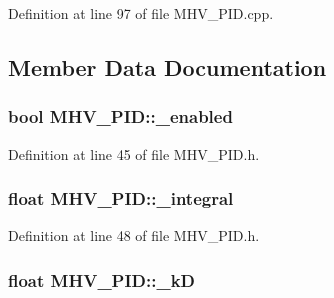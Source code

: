 \-Definition at line 97 of file \-M\-H\-V\-\_\-\-P\-I\-D.\-cpp.



\subsection{\-Member \-Data \-Documentation}
\hypertarget{class_m_h_v___p_i_d_a17e676a4ac1b18dcf30417b73265e87f}{
\subsubsection[{\-\_\-enabled}]{\setlength{\rightskip}{0pt plus 5cm}bool {\bf \-M\-H\-V\-\_\-\-P\-I\-D\-::\-\_\-enabled}}}
\label{class_m_h_v___p_i_d_a17e676a4ac1b18dcf30417b73265e87f}


\-Definition at line 45 of file \-M\-H\-V\-\_\-\-P\-I\-D.\-h.

\hypertarget{class_m_h_v___p_i_d_a26def3787ab18a8681c361720090b0df}{
\subsubsection[{\-\_\-integral}]{\setlength{\rightskip}{0pt plus 5cm}float {\bf \-M\-H\-V\-\_\-\-P\-I\-D\-::\-\_\-integral}}}
\label{class_m_h_v___p_i_d_a26def3787ab18a8681c361720090b0df}


\-Definition at line 48 of file \-M\-H\-V\-\_\-\-P\-I\-D.\-h.

\hypertarget{class_m_h_v___p_i_d_a64e69c4f8d1823d16314c88f98a4e18b}{
\subsubsection[{\-\_\-k\-D}]{\setlength{\rightskip}{0pt plus 5cm}float {\bf \-M\-H\-V\-\_\-\-P\-I\-D\-::\-\_\-k\-D}}}
\label{class_m_h_v___p_i_d_a64e69c4f8d1823d16314c88f98a4e18b}


